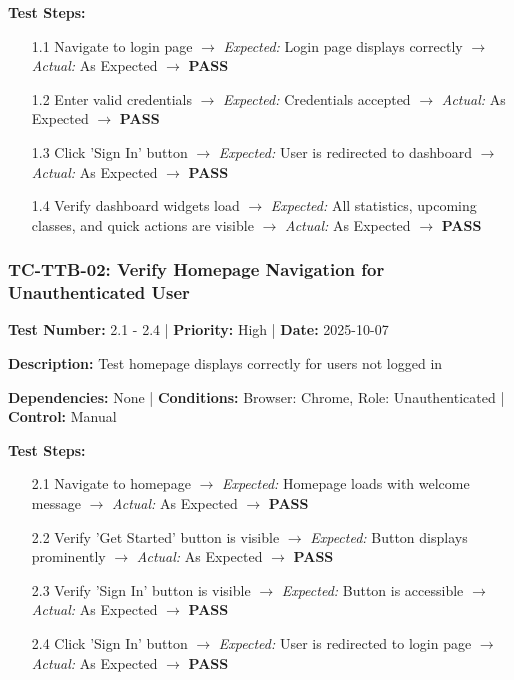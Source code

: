 \textbf{Test Steps:}
\begin{enumerate}[leftmargin=*]
    \item[1.1] Navigate to login page $\rightarrow$ \textit{Expected:} Login page displays correctly $\rightarrow$ \textit{Actual:} As Expected $\rightarrow$ \textbf{PASS}
    \item[1.2] Enter valid credentials $\rightarrow$ \textit{Expected:} Credentials accepted $\rightarrow$ \textit{Actual:} As Expected $\rightarrow$ \textbf{PASS}
    \item[1.3] Click 'Sign In' button $\rightarrow$ \textit{Expected:} User is redirected to dashboard $\rightarrow$ \textit{Actual:} As Expected $\rightarrow$ \textbf{PASS}
    \item[1.4] Verify dashboard widgets load $\rightarrow$ \textit{Expected:} All statistics, upcoming classes, and quick actions are visible $\rightarrow$ \textit{Actual:} As Expected $\rightarrow$ \textbf{PASS}
\end{enumerate}

\subsubsection{TC-TTB-02: Verify Homepage Navigation for Unauthenticated User}

\textbf{Test Number:} 2.1 - 2.4 | \textbf{Priority:} High | \textbf{Date:} 2025-10-07

\textbf{Description:} Test homepage displays correctly for users not logged in

\textbf{Dependencies:} None | \textbf{Conditions:} Browser: Chrome, Role: Unauthenticated | \textbf{Control:} Manual

\textbf{Test Steps:}
\begin{enumerate}[leftmargin=*]
    \item[2.1] Navigate to homepage $\rightarrow$ \textit{Expected:} Homepage loads with welcome message $\rightarrow$ \textit{Actual:} As Expected $\rightarrow$ \textbf{PASS}
    \item[2.2] Verify 'Get Started' button is visible $\rightarrow$ \textit{Expected:} Button displays prominently $\rightarrow$ \textit{Actual:} As Expected $\rightarrow$ \textbf{PASS}
    \item[2.3] Verify 'Sign In' button is visible $\rightarrow$ \textit{Expected:} Button is accessible $\rightarrow$ \textit{Actual:} As Expected $\rightarrow$ \textbf{PASS}
    \item[2.4] Click 'Sign In' button $\rightarrow$ \textit{Expected:} User is redirected to login page $\rightarrow$ \textit{Actual:} As Expected $\rightarrow$ \textbf{PASS}
\end{enumerate}

